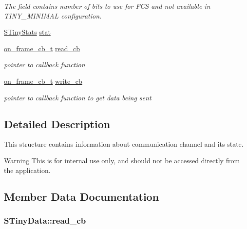 \begin{DoxyCompactItemize}
\begin{DoxyCompactList}\small\item\em The field contains number of bits to use for F\+C\+S and not available in T\+I\+N\+Y\+\_\+\+M\+I\+N\+I\+M\+A\+L configuration. \end{DoxyCompactList}\item 
\hyperlink{structSTinyStats}{S\+Tiny\+Stats} \hyperlink{structSTinyData_a16ba8c9e60d6aee3fcd4909f85561f3d}{stat}
\item 
\hyperlink{inc_2tiny__layer2_8h_acf94db3677aab46f4a42978d53cc23e3}{on\+\_\+frame\+\_\+cb\+\_\+t} \hyperlink{structSTinyData_a31ba50154472c11e0d063b0aeef95f4d}{read\+\_\+cb}
\begin{DoxyCompactList}\small\item\em pointer to callback function \end{DoxyCompactList}\item 
\hyperlink{inc_2tiny__layer2_8h_acf94db3677aab46f4a42978d53cc23e3}{on\+\_\+frame\+\_\+cb\+\_\+t} \hyperlink{structSTinyData_ada334c88e86bfd2c10191f65818c3fb3}{write\+\_\+cb}
\begin{DoxyCompactList}\small\item\em pointer to callback function to get data being sent \end{DoxyCompactList}\end{DoxyCompactItemize}


\subsection{Detailed Description}
This structure contains information about communication channel and its state. \begin{DoxyWarning}{Warning}
This is for internal use only, and should not be accessed directly from the application. 
\end{DoxyWarning}


\subsection{Member Data Documentation}
\hypertarget{structSTinyData_a31ba50154472c11e0d063b0aeef95f4d}{}
\subsubsection[{read\+\_\+cb}]{ S\+Tiny\+Data\+::read\+\_\+cb}\label{structSTinyData_a31ba50154472c11e0d063b0aeef95f4d}


